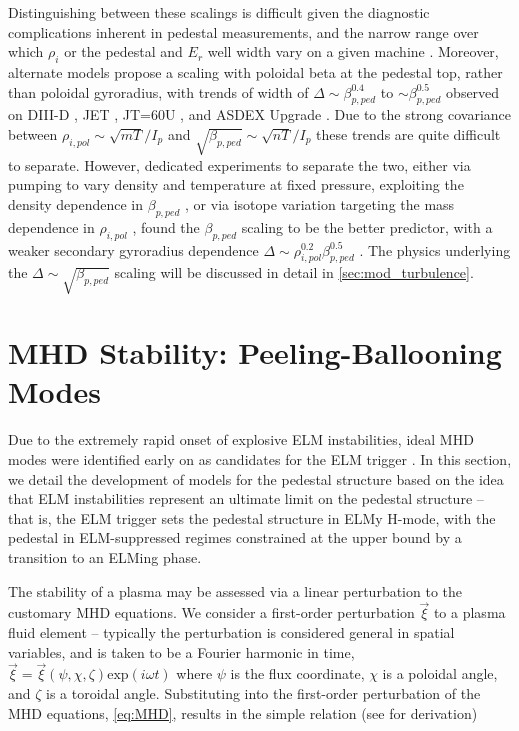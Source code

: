 Distinguishing between these scalings is difficult given the diagnostic complications inherent in pedestal measurements, and the narrow range over which $\rho_i$ or the pedestal and $E_r$ well width vary on a given machine \cite{Gohil1998,Maggi2010}.  Moreover, alternate models propose a scaling with poloidal beta at the pedestal top, rather than poloidal gyroradius, with trends of width of $\Delta \sim \beta_{p,ped}^{0.4}$ to $\sim \beta_{p,ped}^{0.5}$ observed on DIII-D \cite{Osborne1998,Groebner1998a}, JET \cite{Maggi2010}, JT=60U \cite{Urano2008}, and ASDEX Upgrade \cite{Beurskens2011}.  Due to the strong covariance between $\rho_{i,pol} \sim \sqrt{mT}/I_p$ and $\sqrt{\beta_{p,ped}} \sim \sqrt{nT}/I_p$ these trends are quite difficult to separate.  However, dedicated experiments to separate the two, either via pumping to vary density and temperature at fixed pressure, exploiting the density dependence in $\beta_{p,ped}$ \cite{Osborne1998}, or via isotope variation targeting the mass dependence in $\rho_{i,pol}$ \cite{Urano2008,Saibene1999}, found the $\beta_{p,ped}$ scaling to be the better predictor, with a weaker secondary gyroradius dependence $\Delta \sim \rho_{i,pol}^{0.2} \beta_{p,ped}^{0.5}$ \cite{Urano2008,Maggi2010}.  The physics underlying the $\Delta \sim \sqrt{\beta_{p,ped}}$ scaling will be discussed in detail in \cref{sec:mod_turbulence}.\nicesectionending

\section{MHD Stability: Peeling-Ballooning Modes}\label{sec:mod_pb}

Due to the extremely rapid onset of explosive ELM instabilities, ideal MHD modes were identified early on as candidates for the ELM trigger \cite{Wagner1982,Keilhacker1984,Huysmans2005}.  In this section, we detail the development of models for the pedestal structure based on the idea that ELM instabilities represent an ultimate limit on the pedestal structure -- that is, the ELM trigger sets the pedestal structure in ELMy H-mode, with the pedestal in ELM-suppressed regimes constrained at the upper bound by a transition to an ELMing phase.

The stability of a plasma may be assessed via a linear perturbation to the customary MHD equations.  We consider a first-order perturbation $\vec{\xi}$ to a plasma fluid element -- typically the perturbation is considered general in spatial variables, and is taken to be a Fourier harmonic in time, $\vec{\xi} = \vec{\xi}(\psi,\chi,\zeta) \mbox{exp}(i\omega t)$ where $\psi$ is the flux coordinate, $\chi$ is a poloidal angle, and $\zeta$ is a toroidal angle.  Substituting into the first-order perturbation of the MHD equations, \cref{eq:MHD}, results in the simple relation (see \cite[\S 8]{Freidberg1987} for derivation)


